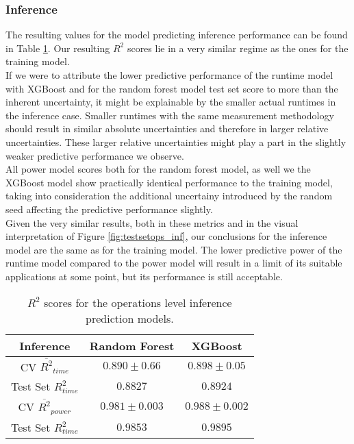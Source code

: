 \subsubsection{Inference}

The resulting values for the model predicting inference performance can be found in Table \ref{tab:pred_res_inf}. Our resulting $R^2$ scores lie in a very similar regime as the ones for the training model. \\
If we were to attribute the lower predictive performance of the runtime model with XGBoost and for the random forest model test set score to more than the inherent uncertainty, it might be explainable by the smaller actual runtimes in the inference case. Smaller runtimes with the same measurement methodology should result in similar absolute uncertainties and therefore in larger relative uncertainties. These larger relative uncertainties might play a part in the slightly weaker predictive performance we observe.\\
All power model scores both for the random forest model, as well we the XGBoost model show practically identical performance to the training model, taking into consideration the additional uncertainy introduced by the random seed affecting the predictive performance slightly. \\
Given the very similar results, both in these metrics and in the visual interpretation of Figure \ref{fig:testsetops_inf}, our conclusions for the inference model are the same as for the training model. The lower predictive power of the runtime model compared to the power model will result in a limit of its suitable applications at some point, but its performance is still acceptable. 



\begin{table}[h!]
\centering
\begin{tabular}{|c|c|c|}
\hline
 \textbf{Inference}& \textbf{Random Forest} & \textbf{XGBoost} \\
\hline
CV $\overline{R^2}_{time}$ & $0.890 \pm 0.66$ &  $0.898 \pm 0.05$ \\
\hline
Test Set $R^2_{time}$ & $0.8827$ & $0.8924$ \\
\hline
CV $\overline{R^2}_{power}$ & $0.981 \pm 0.003$  &  $0.988 \pm 0.002$\\
\hline
Test Set $R^2_{time}$ & $0.9853$ & $0.9895$ \\
\hline
\end{tabular}
\caption{$R^2$ scores for the operations level inference prediction models.}
\label{tab:pred_res_inf}
\end{table}




